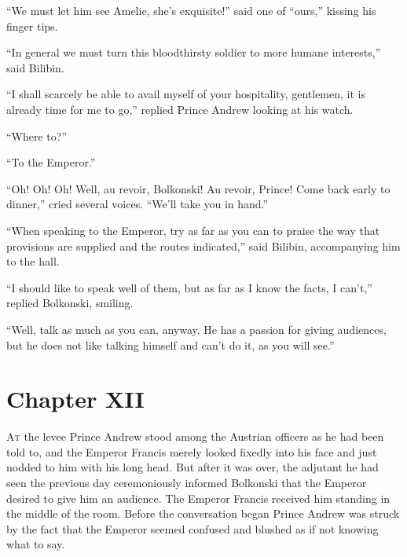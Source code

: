 ``We must let him see Amelie, she's exquisite!'' said one of
``ours,'' kissing his finger tips.

``In general we must turn this bloodthirsty soldier to more
humane interests,'' said Bilibin.

``I shall scarcely be able to avail myself of your hospitality,
gentlemen, it is already time for me to go,'' replied Prince
Andrew looking at his watch.

``Where to?''

``To the Emperor.''

``Oh! Oh! Oh! Well, au revoir, Bolkonski! Au revoir, Prince! Come
back early to dinner,'' cried several voices. ``We'll take you in
hand.''

``When speaking to the Emperor, try as far as you can to praise
the way that provisions are supplied and the routes indicated,''
said Bilibin, accompanying him to the hall.

``I should like to speak well of them, but as far as I know the
facts, I can't,'' replied Bolkonski, smiling.

``Well, talk as much as you can, anyway. He has a passion for
giving audiences, but he does not like talking himself and can't
do it, as you will see.''


\chapter*{Chapter XII}
\ifaudio     {} \fi

\lettrine[lines=2, loversize=0.3, lraise=0]{\initfamily A}{t}
the levee Prince Andrew stood among the Austrian officers as
he had been told to, and the Emperor Francis merely looked
fixedly into his face and just nodded to him with his long
head. But after it was over, the adjutant he had seen the
previous day ceremoniously informed Bolkonski that the Emperor
desired to give him an audience. The Emperor Francis received him
standing in the middle of the room. Before the conversation began
Prince Andrew was struck by the fact that the Emperor seemed
confused and blushed as if not knowing what to say.

